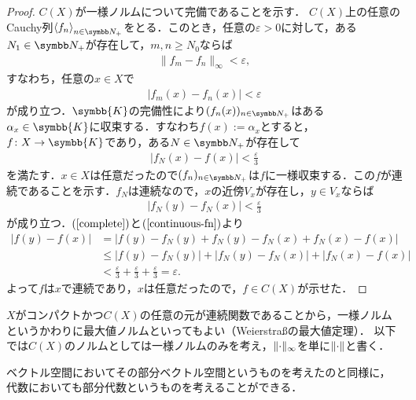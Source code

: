 \documentclass[../main.tex]{subfiles}
\begin{document}
\begin{proof}
\(C(X)\)が一様ノルムについて完備であることを示す．
\(C(X)\)上の任意のCauchy列\(\Sequencen{f}\)をとる．このとき，任意の\(\varepsilon > 0\)に対して，ある\(N_1 \in \PositiveInteger\)が存在して，\(m, n \geq N_0\)ならば
\begin{align*}
  \lVert f_m - f_n \rVert_\infty < \varepsilon,
\end{align*}
すなわち，任意の\(x \in X\)で
\begin{align*}
  \lvert f_m(x) - f_n(x) \rvert < \varepsilon
\end{align*}
が成り立つ．\(\symbb{K}\)の完備性により\((f_n(x))_{n \in \PositiveInteger}\)はある\(\alpha_x \in \symbb{K}\)に収束する．すなわち\(f(x) := \alpha_x\)とすると，\(f\colon X \to \symbb{K}\)であり，ある\(N \in \PositiveInteger\)が存在して
\begin{align}
  |f_N(x) - f(x)| < \frac{\varepsilon}{3}
  \label{complete}
\end{align}
を満たす．\(x \in X\)は任意だったので\((f_n)_{n \in \PositiveInteger}\)は\(f\)に一様収束する．この\(f\)が連続であることを示す．\(f_N\)は連続なので，\(x\)の近傍\(V_x\)が存在し，\(y \in V_x\)ならば
\begin{align}
  \lvert f_N(y) - f_N(x) \rvert < \frac{\varepsilon}{3}
  \label{continuous-fn}
\end{align}
が成り立つ．\((\ref{complete})\)と\((\ref{continuous-fn})\)より
\begin{align*}
  \lvert f(y) - f(x) \rvert
  &= \lvert f(y) - f_N(y) + f_N(y) - f_N(x) + f_N(x) - f(x) \rvert \\
  &\leq |f(y) - f_N(y)| + |f_N(y) - f_N(x)| + |f_N(x) - f(x)| \\
  &< \frac{\varepsilon}{3} + \frac{\varepsilon}{3} + \frac{\varepsilon}{3} = \varepsilon.
\end{align*}
よって\(f\)は\(x\)で連続であり，\(x\)は任意だったので，\(f \in C(X)\)が示せた．
\end{proof}

\(X\)がコンパクトかつ\(C(X)\)の任意の元が連続関数であることから，一様ノルムというかわりに最大値ノルムといってもよい（Weierstraßの最大値定理）．
以下では\(C(X)\)のノルムとしては一様ノルムのみを考え，\(\lVert \mathord{\cdot} \rVert_\infty\)を単に\(\lVert \mathord{\cdot} \rVert\)と書く．

ベクトル空間においてその部分ベクトル空間というものを考えたのと同様に，
代数においても部分代数というものを考えることができる．
\end{document}
